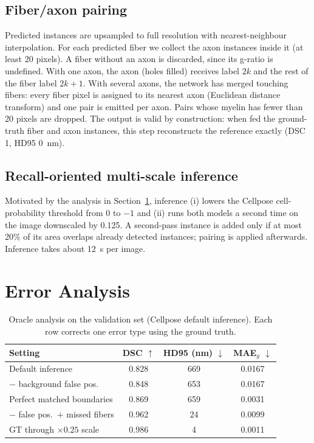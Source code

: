 \documentclass[conference]{IEEEtran}
\begin{document}
\subsection{Fiber/axon pairing}
Predicted instances are upsampled to full resolution with nearest-neighbour
interpolation. For each predicted fiber we collect the axon instances inside it
(at least 20 pixels). A fiber without an axon is discarded, since its g-ratio is
undefined. With one axon, the axon (holes filled) receives label $2k$ and the
rest of the fiber label $2k+1$. With several axons, the network has merged
touching fibers: every fiber pixel is assigned to its nearest axon (Euclidean
distance transform) and one pair is emitted per axon. Pairs whose myelin has
fewer than 20 pixels are dropped. The output is valid by construction: when fed
the ground-truth fiber and axon instances, this step reconstructs the reference
exactly (DSC 1, HD95 0~nm).

\subsection{Recall-oriented multi-scale inference}
\label{sec:inference}
Motivated by the analysis in Section~\ref{sec:analysis}, inference (i) lowers the
Cellpose cell-probability threshold from 0 to $-1$ and (ii) runs both models a
second time on the image downscaled by 0.125. A second-pass instance is added
only if at most 20\% of its area overlaps already detected instances; pairing
is applied afterwards. Inference takes about 12~s per image.

\section{Error Analysis}
\label{sec:analysis}

\begin{table}[t]
\caption{Oracle analysis on the validation set (Cellpose default inference).
Each row corrects one error type using the ground truth.}
\label{tab:oracle}
\centering
\small
\setlength{\tabcolsep}{3.5pt}
\begin{tabular}{@{}lccc@{}}
\toprule
Setting & DSC $\uparrow$ & HD95 (nm) $\downarrow$ & MAE$_g$ $\downarrow$ \\
\midrule
Default inference              & 0.828 & 669 & 0.0167 \\
$-$ background false pos.      & 0.848 & 653 & 0.0167 \\
Perfect matched boundaries     & 0.869 & 659 & 0.0031 \\
$-$ false pos.\ $+$ missed fibers & 0.962 & 24 & 0.0099 \\
GT through $\times0.25$ scale  & 0.986 & 4 & 0.0011 \\
\bottomrule
\end{tabular}
\end{table}
\end{document}
